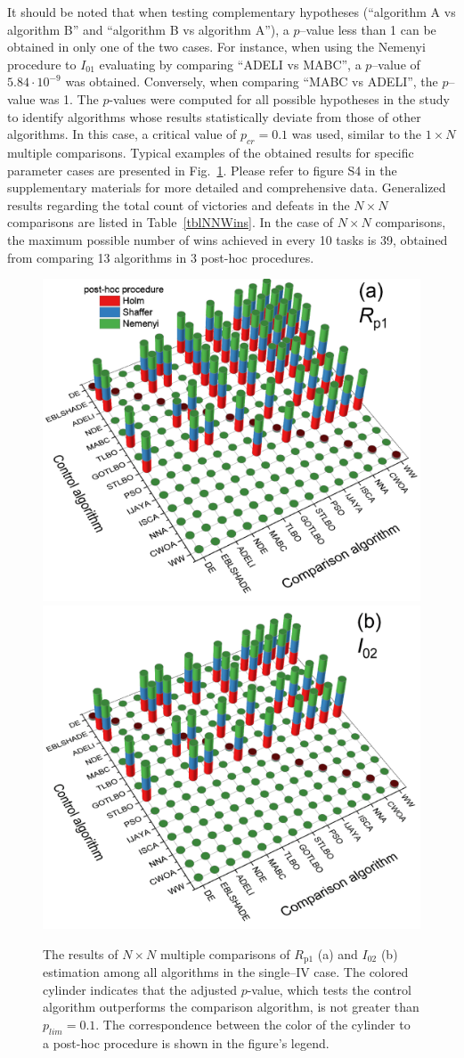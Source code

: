 \documentclass[a4paper,fleqn]{cas-sc}
\begin{document}
It should be noted that when testing complementary hypotheses
(``algorithm A vs algorithm B'' and ``algorithm B vs algorithm A''),
a $p$--value less than 1 can be obtained in only one of the two cases.
For instance, when using the Nemenyi procedure to $I_{01}$ evaluating by comparing ``ADELI vs MABC'',
a $p$--value of $5.84\cdot10^{-9}$ was obtained.
Conversely, when comparing ``MABC vs ADELI'', the $p$--value was 1.
The $p$-values were computed for all possible hypotheses in the study to identify algorithms whose results statistically deviate from those of other algorithms.
In this case, a critical value of $p_{cr}=0.1$ was used, similar to the $1\times N$ multiple comparisons.
Typical examples of the obtained results for specific parameter cases are presented in Fig.~\ref{figNNRezSingleIV}.
Please refer to figure S4 in the supplementary materials for more detailed and comprehensive data.
Generalized results regarding the total count of victories and defeats in the $N\times N$ comparisons
are listed in Table~\ref{tblNNWins}.
 In the case of $N\times N$ comparisons, the maximum possible number of wins achieved in every 10 tasks is 39,
obtained from comparing 13 algorithms in 3 post-hoc procedures.


\begin{figure}[!ht]
	\centering
		\includegraphics[width=.49\textwidth]{Rp1shot_NN}
        \includegraphics[width=.49\textwidth]{I02shot_NN}
	  \caption{The results of $N\times N$ multiple comparisons of $R_\mathrm{p1}$ (a) and $I_{02}$ (b) estimation
               among all algorithms in the single--IV case.
               The colored cylinder indicates that the adjusted $p$-value,
               which tests the control algorithm outperforms the comparison algorithm,
               is not greater than $p_{lim}=0.1$.
               The correspondence between the color of the cylinder to a post-hoc procedure is shown in the figure's legend.
               }\label{figNNRezSingleIV}
\end{figure}
\end{document}
